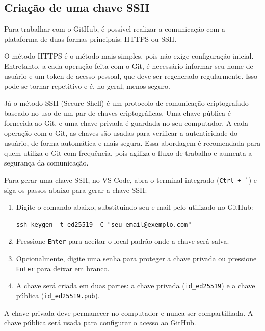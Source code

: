 \begin{enumerate}
\end{enumerate}

\subsection{Criação de uma chave SSH}
\label{cap:criacao_chave_ssh}

Para trabalhar com o GitHub, é possível realizar a comunicação com a plataforma de duas formas principais: HTTPS ou SSH.

O método HTTPS é o método mais simples, pois não exige configuração inicial. Entretanto, a cada operação feita com o Git, é necessário informar seu nome de usuário e um token de acesso pessoal, que deve ser regenerado regularmente. Isso pode se tornar repetitivo e é, no geral, menos seguro.

Já o método SSH (Secure Shell) é um protocolo de comunicação criptografado baseado no uso de um par de chaves criptográficas. Uma chave pública é fornecida ao Git, e uma chave privada é guardada no seu computador. A cada operação com o Git, as chaves são usadas para verificar a autenticidade do usuário, de forma automática e mais segura. Essa abordagem é recomendada para quem utiliza o Git com frequência, pois agiliza o fluxo de trabalho e aumenta a segurança da comunicação.

Para gerar uma chave SSH, no VS Code, abra o terminal integrado (\texttt{Ctrl + \`}) e siga os passos abaixo para gerar a chave SSH:

\begin{enumerate}
    \item Digite o comando abaixo, substituindo seu e-mail pelo utilizado no GitHub:
    \begin{lstlisting}[style=shellstyle]
ssh-keygen -t ed25519 -C "seu-email@exemplo.com"
    \end{lstlisting}
    \item Pressione \texttt{Enter} para aceitar o local padrão onde a chave será salva.
    \item Opcionalmente, digite uma senha para proteger a chave privada ou pressione \texttt{Enter} para deixar em branco.
    \item A chave será criada em duas partes: a chave privada (\texttt{id\_ed25519}) e a chave pública (\texttt{id\_ed25519.pub}).
\end{enumerate}

A chave privada deve permanecer no computador e nunca ser compartilhada. A chave pública será usada para configurar o acesso ao GitHub.

